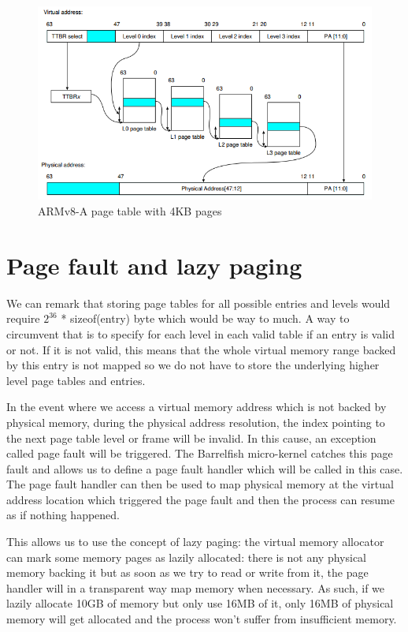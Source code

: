 \begin{figure}
    \centering
    \includegraphics[scale=0.6]{images/memory/page_table.png}
    \caption{ARMv8-A page table with 4KB pages}
\end{figure}

\section{Page fault and lazy paging}

We can remark that storing page tables for all possible entries and levels would require $2^36$ * sizeof(entry) byte which would be way to much. A way to circumvent that is to specify for each level in each valid table if an entry is valid or not. If it is not valid, this means that the whole virtual memory range backed by this entry is not mapped so we do not have to store the underlying higher level page tables and entries.

In the event where we access a virtual memory address which is not backed by physical memory, during the physical address resolution, the index pointing to the next page table level or frame will be invalid. In this cause, an exception called page fault will be triggered. The Barrelfish micro-kernel catches this page fault and allows us to define a page fault handler which will be called in this case. The page fault handler can then be used to map physical memory at the virtual address location which triggered the page fault and then the process can resume as if nothing happened.

This allows us to use the concept of lazy paging: the virtual memory allocator can mark some memory pages as lazily allocated: there is not any physical memory backing it but as soon as we try to read or write from it, the page handler will in a transparent way map memory when necessary.
As such, if we lazily allocate 10GB of memory but only use 16MB of it, only 16MB of physical memory will get allocated and the process won't suffer from insufficient memory.



